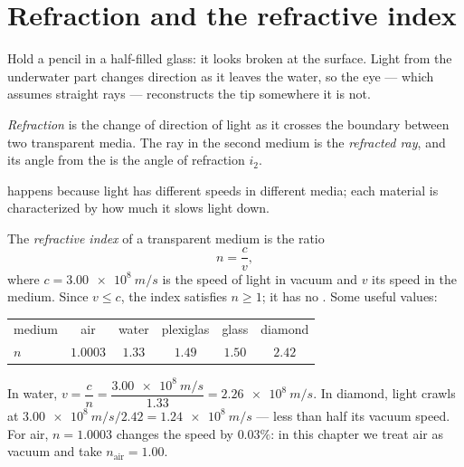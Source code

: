 \section{Refraction and the refractive index}

Hold a pencil in a half-filled glass: it looks broken at the surface.
Light from the underwater part changes direction as it leaves the water,
so the eye --- which assumes straight rays --- reconstructs the tip
somewhere it is not.

\begin{definition}[Refraction]\label{def:g10:refraction:refraction}
\emph{Refraction} is the change of direction of light
as it crosses the boundary between two transparent media. The ray in the
second medium is the \emph{refracted ray}, and its
angle from the  is the angle of refraction $i_2$.
\end{definition}

 happens because light has different speeds in different
media; each material is characterized by how much it slows light down.

\begin{definition}\label{def:g10:refraction:index}
The \emph{refractive index} of a transparent
medium is the ratio
\[
n = \frac{c}{v},
\]
where $c = \qty{3.00e8}{m/s}$ is the speed of light in vacuum and $v$ its
speed in the medium. Since $v \leq c$, the index satisfies $n \geq 1$; it
has no . Some useful values:
\begin{center}
\begin{tabular}{lccccc}
medium & air & water & plexiglas & glass & diamond \\
$n$ & $1.0003$ & $1.33$ & $1.49$ & $1.50$ & $2.42$ \\
\end{tabular}
\end{center}
\end{definition}

\begin{example}\label{ex:g10:refraction:speed}
In water, $v = \dfrac{c}{n} = \dfrac{\qty{3.00e8}{m/s}}{1.33}
= \qty{2.26e8}{m/s}$. In diamond, light crawls at
$\qty{3.00e8}{m/s}/2.42 = \qty{1.24e8}{m/s}$ --- less than half its
vacuum speed. For air, $n = 1.0003$ changes the speed by $0.03\%$: in
this chapter we treat air as vacuum and take $n_{\text{air}} = 1.00$.
\end{example}

